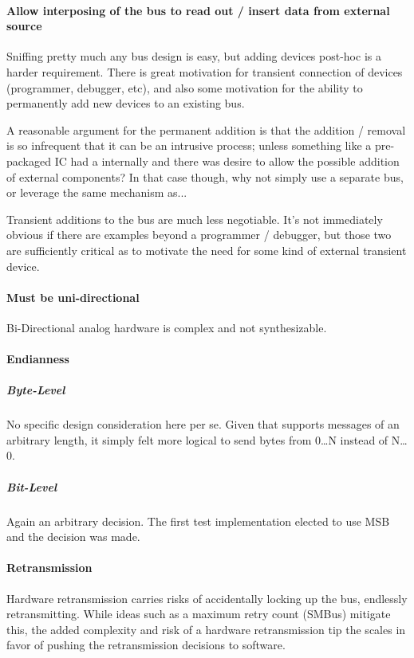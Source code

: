 \paragraph{Allow interposing of the bus to read out / insert data from
external source}
Sniffing pretty much any bus design is easy, but adding devices post-hoc is a
harder requirement. There is great motivation for transient connection of
devices (programmer, debugger, etc), and also some motivation for the ability
to permanently add new devices to an existing bus.

A reasonable argument for the permanent addition is that the addition /
removal is so infrequent that it can be an intrusive process; unless something
like a pre-packaged IC had a \bus internally and there was desire to allow the
possible addition of external components? In that case though, why not simply
use a separate bus, or leverage the same mechanism as...

Transient additions to the bus are much less negotiable. It's not immediately
obvious if there are examples beyond a programmer / debugger, but those two
are sufficiently critical as to motivate the need for some kind of external
transient device.

\paragraph{Must be uni-directional}
Bi-Directional analog hardware is complex and not synthesizable.

\paragraph{Endianness}
\subparagraph{Byte-Level}
No specific design consideration here per se. Given that \bus supports
messages of an arbitrary length, it simply felt more logical to send bytes
from 0{\ldots}N instead of N{\ldots}0.
\subparagraph{Bit-Level}
Again an arbitrary decision. The first test implementation elected to use MSB
and the decision was made.

\paragraph{Retransmission}
Hardware retransmission carries risks of accidentally locking up the bus,
endlessly retransmitting. While ideas such as a maximum retry count (SMBus)
mitigate this, the added complexity and risk of a hardware retransmission tip
the scales in favor of pushing the retransmission decisions to software.

